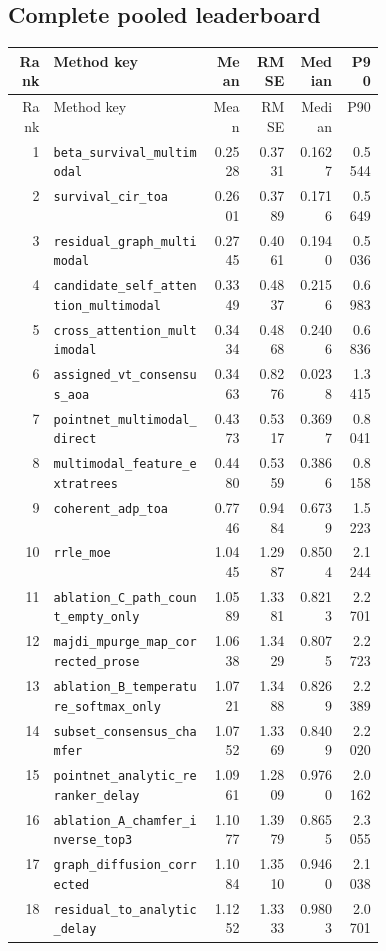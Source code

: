 \documentclass[10pt]{article}
\newcommand{\code}[1]{\nolinkurl{#1}}
\begin{document}
\subsection{Complete pooled leaderboard}

\scriptsize
\begin{longtable}{@{}r p{0.43\linewidth}rrrr@{}}
\toprule Rank & Method key & Mean & RMSE & Median & P90\\\midrule
\endfirsthead
\toprule Rank & Method key & Mean & RMSE & Median & P90\\\midrule
\endhead
1 & \code{beta_survival_multimodal} & 0.2528 & 0.3731 & 0.1627 & 0.5544\\
2 & \code{survival_cir_toa} & 0.2601 & 0.3789 & 0.1716 & 0.5649\\
3 & \code{residual_graph_multimodal} & 0.2745 & 0.4061 & 0.1940 & 0.5036\\
4 & \code{candidate_self_attention_multimodal} & 0.3349 & 0.4837 & 0.2156 & 0.6983\\
5 & \code{cross_attention_multimodal} & 0.3434 & 0.4868 & 0.2406 & 0.6836\\
6 & \code{assigned_vt_consensus_aoa} & 0.3463 & 0.8276 & 0.0238 & 1.3415\\
7 & \code{pointnet_multimodal_direct} & 0.4373 & 0.5317 & 0.3697 & 0.8041\\
8 & \code{multimodal_feature_extratrees} & 0.4480 & 0.5359 & 0.3866 & 0.8158\\
9 & \code{coherent_adp_toa} & 0.7746 & 0.9484 & 0.6739 & 1.5223\\
10 & \code{rrle_moe} & 1.0445 & 1.2987 & 0.8504 & 2.1244\\
11 & \code{ablation_C_path_count_empty_only} & 1.0589 & 1.3381 & 0.8213 & 2.2701\\
12 & \code{majdi_mpurge_map_corrected_prose} & 1.0638 & 1.3429 & 0.8075 & 2.2723\\
13 & \code{ablation_B_temperature_softmax_only} & 1.0721 & 1.3488 & 0.8269 & 2.2389\\
14 & \code{subset_consensus_chamfer} & 1.0752 & 1.3369 & 0.8409 & 2.2020\\
15 & \code{pointnet_analytic_reranker_delay} & 1.0961 & 1.2809 & 0.9760 & 2.0162\\
16 & \code{ablation_A_chamfer_inverse_top3} & 1.1077 & 1.3979 & 0.8655 & 2.3055\\
17 & \code{graph_diffusion_corrected} & 1.1084 & 1.3510 & 0.9460 & 2.1038\\
18 & \code{residual_to_analytic_delay} & 1.1252 & 1.3333 & 0.9803 & 2.0701\\

\end{longtable}
\end{document}
